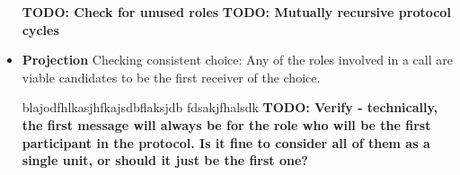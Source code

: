 \documentclass[12pt,twoside]{report}
\begin{document}
\begin{itemize}
\begin{itemize}
    \end{itemize}
    \textbf{TODO: Check for unused roles}
    \textbf{TODO: Mutually recursive protocol cycles}
    
    \item \textbf{Projection}
    Checking consistent choice: Any of the roles involved in a call are viable candidates to be the first receiver of the choice.

    blajodfhlkasjhfkajsdbflaksjdb
    fdsakjfhalsdk 
    \textbf{TODO: Verify - technically, the first message will always be for the role who will be the first participant in the protocol. Is it fine to consider all of them as a single unit, or should it just be the first one?}
\end{itemize}{}



\end{document}
